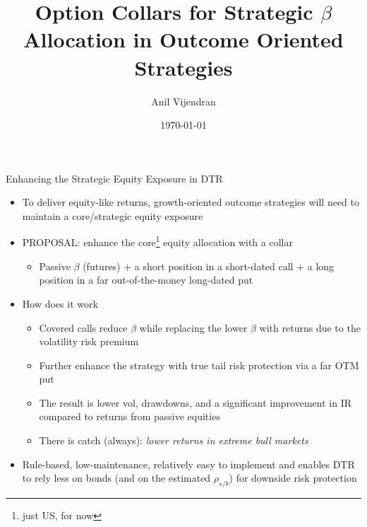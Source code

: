 \documentclass{beamer}
\title[Better Strategic $\beta$]{Option Collars for Strategic $\beta$ Allocation in Outcome Oriented Strategies}
\author[AV]{Anil Vijendran}
\date{\today}
\begin{document}
\begin{frame}
  \titlepage
\end{frame}


\begin{frame}{Enhancing the Strategic Equity Exposure in DTR}
	\begin{itemize}
		\item To deliver equity-like returns, growth-oriented outcome strategies will need to maintain a core/strategic equity exposure
		\item PROPOSAL: enhance the core\footnote{just US, for now} equity allocation with a collar
			\begin{itemize} \item Passive $\beta$ (futures) $+$ a short position in a short-dated call $+$ a long position in a far out-of-the-money long-dated put \end{itemize}
	
		\item How does it work
			\begin{itemize}
			\item Covered calls reduce $\beta$ while replacing the lower $\beta$ with returns due to the volatility risk premium
			\item Further enhance the strategy with true tail risk protection via a far OTM put
			\item The result is lower vol, drawdowns, and a significant improvement in IR compared to returns from passive equities 
			\item There is catch (always): \emph{lower returns in extreme bull markets}
			\end{itemize}

		\item Rule-based, low-maintenance, relatively easy to implement and enables DTR to rely less on bonds (and on the estimated $\rho_{s/b}$) for downside risk protection
	\end{itemize}

\end{frame}
\end{document}
